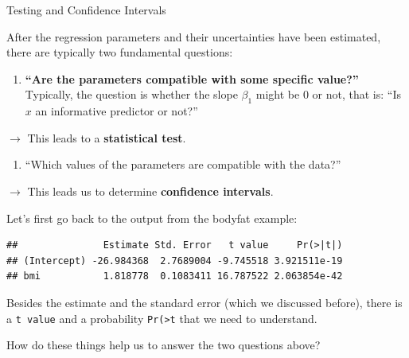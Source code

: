 \documentclass[10pt,ignorenonframetext,]{beamer}
\newenvironment{Shaded}{\begin{snugshade}}{\end{snugshade}}
\newcommand{\KeywordTok}[1]{\textcolor[rgb]{0.13,0.29,0.53}{\textbf{#1}}}
\newcommand{\OperatorTok}[1]{\textcolor[rgb]{0.81,0.36,0.00}{\textbf{#1}}}
\newcommand{\NormalTok}[1]{#1}
\providecommand{\tightlist}{%
  \setlength{\itemsep}{0pt}\setlength{\parskip}{0pt}}
\begin{document}
\begin{frame}{Testing and Confidence Intervals}

After the regression parameters and their uncertainties have been
estimated, there are typically two fundamental questions:

\vspace{4mm}

\begin{enumerate}
\def\labelenumi{\arabic{enumi}.}
\tightlist
\item
  \textbf{``Are the parameters compatible with some specific value?''}
  Typically, the question is whether the slope \(\beta_1\) might be 0 or
  not, that is: ``Is \(x\) an informative predictor or not?''
\end{enumerate}

\hspace{4mm} \(\rightarrow\) This leads to a \textbf{statistical test}.

\vspace{6mm}

\begin{enumerate}
\def\labelenumi{\arabic{enumi}.}
\setcounter{enumi}{1}
\tightlist
\item
  ``Which values of the parameters are compatible with the data?''
\end{enumerate}

\hspace{4mm} \(\rightarrow\) This leads us to determine
\textbf{confidence intervals}.

\end{frame}

\begin{frame}[fragile]

Let's first go back to the output from the bodyfat example:

\scriptsize

\begin{Shaded}
\end{Shaded}

\begin{verbatim}
##               Estimate Std. Error   t value     Pr(>|t|)
## (Intercept) -26.984368  2.7689004 -9.745518 3.921511e-19
## bmi           1.818778  0.1083411 16.787522 2.063854e-42
\end{verbatim}

\normalsize
Besides the estimate and the standard error (which we discussed before),
there is a \texttt{t\ value} and a probability
\texttt{Pr(\textgreater{}\textbar{}t\textbar{}} that we need to
understand.

How do these things help us to answer the two questions above?

\end{frame}
\end{document}
